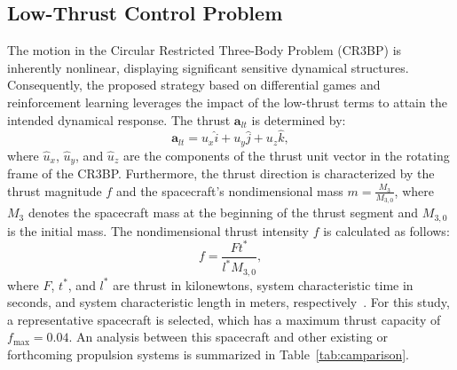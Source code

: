 \documentclass[conference]{IEEEtran}
\begin{document}
\subsection{Low-Thrust Control Problem}
The motion in the Circular Restricted Three-Body Problem (CR3BP) is inherently nonlinear, displaying significant sensitive dynamical structures. Consequently, the proposed strategy based on differential games and reinforcement learning leverages the impact of the low-thrust terms to attain the intended dynamical response. The thrust \(\mathbf{a}_{lt}\) is determined by:
\begin{equation}
\mathbf{a}_{lt} =  {u}_x \hat{i} + {u}_y \hat{j} + {u}_z \hat{k},
\end{equation}
where \( \hat{u}_x \), \( \hat{u}_y \), and \( \hat{u}_z \) are the components of the thrust unit vector in the rotating frame of the CR3BP. Furthermore, the thrust direction is characterized by the thrust magnitude \( f \) and the spacecraft's nondimensional mass \( m = \frac{M_3}{M_{3,0}} \), where \( M_3 \) denotes the spacecraft mass at the beginning of the thrust segment and \( M_{3,0} \) is the initial mass.
The nondimensional thrust intensity \( f \) is calculated as follows:
\begin{equation}
f = \dfrac{Ft^*}{l^* M_{3,0}},	
\end{equation}
where \( F \), \(t^*\), and \(l^*\) are thrust in kilonewtons, system characteristic time in seconds, and system characteristic length in meters, respectively~\cite{lafarge}. 
For this study, a representative spacecraft is selected, which has a maximum thrust capacity of \( f_{\text{max}} = 0.04 \). An analysis between this spacecraft and other existing or forthcoming propulsion systems is summarized in Table~\ref{tab:camparison}.
\end{document}
